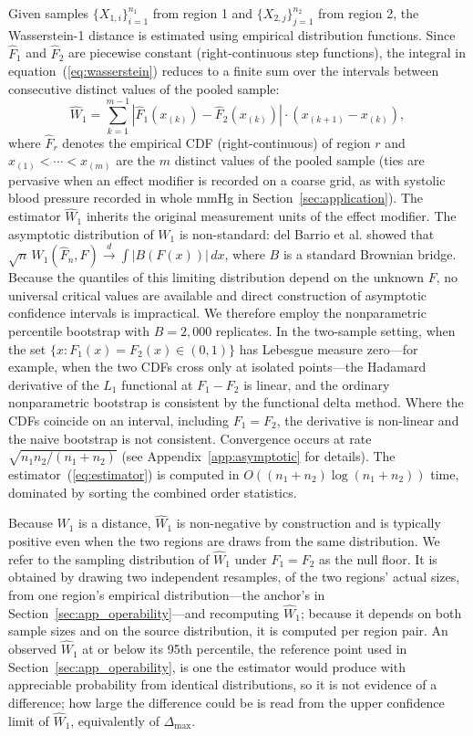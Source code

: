 Given samples $\{X_{1,i}\}_{i=1}^{n_1}$ from region 1 and $\{X_{2,j}\}_{j=1}^{n_2}$ from region 2, the Wasserstein-1 distance is estimated using empirical distribution functions. Since $\hat{F}_1$ and $\hat{F}_2$ are piecewise constant (right-continuous step functions), the integral in equation~(\ref{eq:wasserstein}) reduces to a finite sum over the intervals between consecutive distinct values of the pooled sample:
\begin{equation}
\widehat{W}_1 = \sum_{k=1}^{m-1} |\hat{F}_1(x_{(k)}) - \hat{F}_2(x_{(k)})| \cdot (x_{(k+1)} - x_{(k)}),
\label{eq:estimator}
\end{equation}
where $\hat{F}_r$ denotes the empirical CDF (right-continuous) of region $r$ and $x_{(1)} < \cdots < x_{(m)}$ are the $m$ distinct values of the pooled sample (ties are pervasive when an effect modifier is recorded on a coarse grid, as with systolic blood pressure recorded in whole mmHg in Section~\ref{sec:application}). The estimator $\widehat{W}_1$ inherits the original measurement units of the effect modifier. The asymptotic distribution of $W_1$ is non-standard: del Barrio et al.\cite{delbarrio1999} showed that $\sqrt{n}\,W_1(\hat{F}_n, F) \xrightarrow{d} \int |B(F(x))|\,dx$, where $B$ is a standard Brownian bridge. Because the quantiles of this limiting distribution depend on the unknown $F$, no universal critical values are available and direct construction of asymptotic confidence intervals is impractical. We therefore employ the nonparametric percentile bootstrap with $B = 2{,}000$ replicates.\cite{efron1993} In the two-sample setting, when the set $\{x : F_1(x) = F_2(x) \in (0,1)\}$ has Lebesgue measure zero---for example, when the two CDFs cross only at isolated points---the Hadamard derivative of the $L_1$ functional at $F_1 - F_2$ is linear, and the ordinary nonparametric bootstrap is consistent by the functional delta method.\cite{fang2019} Where the CDFs coincide on an interval, including $F_1 = F_2$, the derivative is non-linear and the naive bootstrap is not consistent.\cite{dumbgen1993,fang2019,sommerfeld2018} Convergence occurs at rate $\sqrt{n_1 n_2/(n_1+n_2)}$ (see Appendix~\ref{app:asymptotic} for details). The estimator~(\ref{eq:estimator}) is computed in $O((n_1 + n_2) \log(n_1 + n_2))$ time, dominated by sorting the combined order statistics.

Because $W_1$ is a distance, $\widehat{W}_1$ is non-negative by construction and is typically positive even when the two regions are draws from the same distribution. We refer to the sampling distribution of $\widehat{W}_1$ under $F_1 = F_2$ as the null floor. It is obtained by drawing two independent resamples, of the two regions' actual sizes, from one region's empirical distribution---the anchor's in Section~\ref{sec:app_operability}---and recomputing $\widehat{W}_1$; because it depends on both sample sizes and on the source distribution, it is computed per region pair. An observed $\widehat{W}_1$ at or below its 95th percentile, the reference point used in Section~\ref{sec:app_operability}, is one the estimator would produce with appreciable probability from identical distributions, so it is not evidence of a difference; how large the difference could be is read from the upper confidence limit of $\widehat{W}_1$, equivalently of $\Delta_{\max}$.

